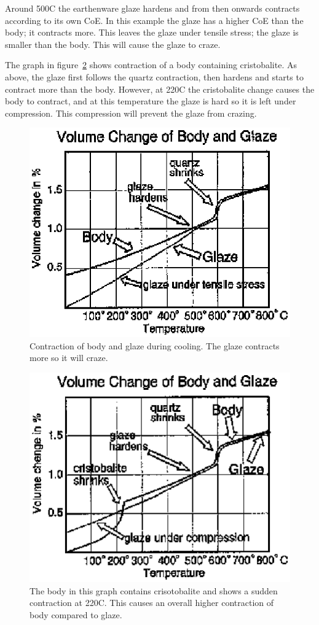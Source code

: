 Around 500\degree C the earthenware glaze hardens and from then onwards 
contracts according to its own CoE. In this example the glaze has a higher CoE 
than the body; it contracts more. This leaves the glaze under tensile stress; 
the glaze is smaller than the body. This will cause the glaze to craze.

The graph in figure~\ref{fig:bodyglazewith} shows contraction of a body 
containing cristobalite. As above, the glaze first follows the quartz 
contraction, then hardens and starts to contract more than the body. However, 
at 220\degree C the cristobalite change causes the body to contract, and at 
this 
temperature the glaze is hard so it is left under compression. This compression 
will prevent the glaze from crazing.
\begin{figure}[htbp!]
  \centering
  \includegraphics[width=0.6\linewidth]{img/bodyglazewithout.eps}
  \caption{Contraction of body and glaze during cooling. The glaze contracts 
  more 
  so it will craze.}
  \label{fig:bodyglazewithout}
\end{figure}
\begin{figure}[htbp!]
  \centering
  \includegraphics[width=0.6\linewidth]{img/bodyglazewith.eps}
  \caption{The body in this graph contains crisotobalite and shows a sudden 
  contraction at 220\degree C. This causes an overall higher contraction of 
  body compared to glaze.}
  \label{fig:bodyglazewith}
\end{figure}

